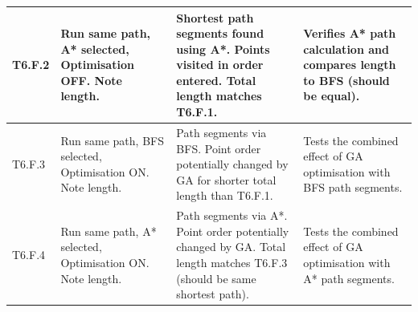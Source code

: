 \begin{longtable}{|p{}|p{}|p{}|p{}|}
	\hline
	T6.F.2 & Run same path, A* selected, Optimisation OFF. Note length. & Shortest path segments found using A*. Points visited in order entered. Total length matches T6.F.1. & Verifies A* path calculation and compares length to BFS (should be equal). \\
	\hline
	T6.F.3 & Run same path, BFS selected, Optimisation ON. Note length. & Path segments via BFS. Point order potentially changed by GA for shorter total length than T6.F.1. & Tests the combined effect of GA optimisation with BFS path segments. \\
	\hline
	T6.F.4 & Run same path, A* selected, Optimisation ON. Note length. & Path segments via A*. Point order potentially changed by GA. Total length matches T6.F.3 (should be same shortest path). & Tests the combined effect of GA optimisation with A* path segments. \\
	\hline
\end{longtable}

